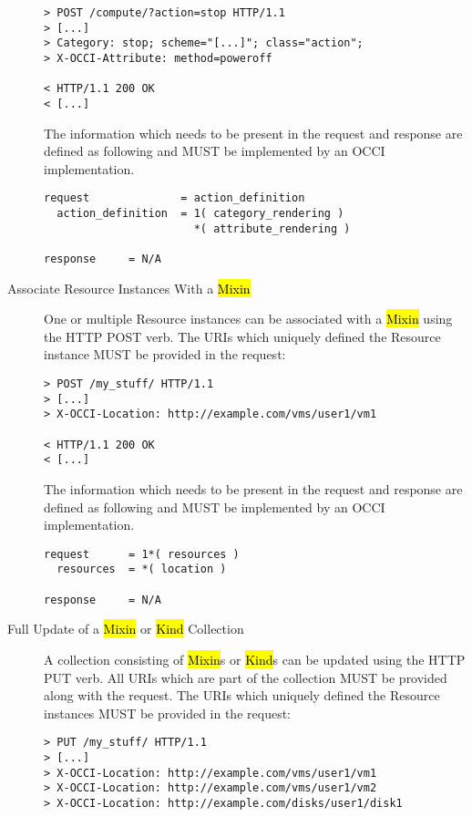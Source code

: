 \documentclass[10pt,a4paper]{article}
\begin{document}
\begin{description}
\begin{verbatim}
> POST /compute/?action=stop HTTP/1.1
> [...]
> Category: stop; scheme="[...]"; class="action";
> X-OCCI-Attribute: method=poweroff

< HTTP/1.1 200 OK
< [...]
\end{verbatim}

    The information which needs to be present in the request and
    response are defined as following and MUST be implemented by an
    OCCI implementation.

\begin{verbatim}
request              = action_definition
  action_definition  = 1( category_rendering )
                       *( attribute_rendering )

response     = N/A
\end{verbatim}

  \item[Associate Resource Instances With a \hl{Mixin}] One or
    multiple Resource instances can be associated with a \hl{Mixin}
    using the HTTP POST verb. The URIs which uniquely defined the
    Resource instance MUST be provided in the request:

\begin{verbatim}
> POST /my_stuff/ HTTP/1.1
> [...]
> X-OCCI-Location: http://example.com/vms/user1/vm1

< HTTP/1.1 200 OK
< [...]
\end{verbatim}

    The information which needs to be present in the request and
    response are defined as following and MUST be implemented by an
    OCCI implementation.

\begin{verbatim}
request      = 1*( resources )
  resources  = *( location )

response     = N/A
\end{verbatim}

  \item[Full Update of a \hl{Mixin} or \hl{Kind} Collection] A
    collection consisting of \hl{Mixin}s or \hl{Kind}s can be updated
    using the HTTP PUT verb. All URIs which are part of the
    collection MUST be provided along with the request. The URIs which
    uniquely defined the Resource instances MUST be provided in the
    request:

\begin{verbatim}
> PUT /my_stuff/ HTTP/1.1
> [...]
> X-OCCI-Location: http://example.com/vms/user1/vm1
> X-OCCI-Location: http://example.com/vms/user1/vm2
> X-OCCI-Location: http://example.com/disks/user1/disk1


\end{verbatim}
\end{description}
\end{document}
